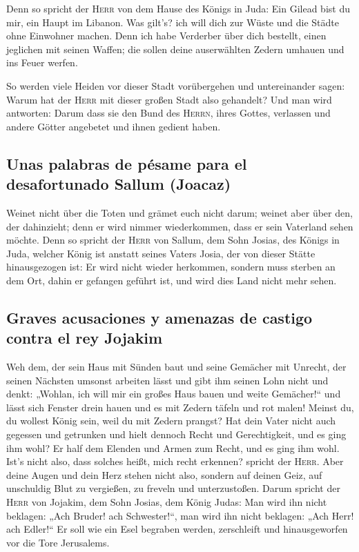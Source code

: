  Denn so spricht der \textsc{Herr} von dem Hause des
Königs in Juda: Ein Gilead bist du mir, ein Haupt im Libanon. Was
gilt's? ich will dich zur Wüste und die Städte ohne Einwohner machen.
 Denn ich habe Verderber über dich bestellt, einen
jeglichen mit seinen Waffen; die sollen deine auserwählten Zedern
umhauen und ins Feuer werfen.

 So werden viele Heiden vor dieser Stadt vorübergehen und
untereinander sagen: Warum hat der \textsc{Herr} mit dieser großen Stadt
also gehandelt?  Und man wird antworten: Darum dass sie
den Bund des \textsc{Herrn}, ihres Gottes, verlassen und andere Götter
angebetet und ihnen gedient haben.

\hypertarget{unas-palabras-de-puxe9same-para-el-desafortunado-sallum-joacaz}{%
\subsection{Unas palabras de pésame para el desafortunado Sallum
(Joacaz)}\label{unas-palabras-de-puxe9same-para-el-desafortunado-sallum-joacaz}}

 Weinet nicht über die Toten und grämet euch nicht darum;
weinet aber über den, der dahinzieht; denn er wird nimmer wiederkommen,
dass er sein Vaterland sehen möchte.  Denn so spricht der
\textsc{Herr} von Sallum, dem Sohn Josias, des Königs in Juda, welcher
König ist anstatt seines Vaters Josia, der von dieser Stätte
hinausgezogen ist: Er wird nicht wieder herkommen, 
sondern muss sterben an dem Ort, dahin er gefangen geführt ist, und wird
dies Land nicht mehr sehen.

\hypertarget{graves-acusaciones-y-amenazas-de-castigo-contra-el-rey-jojakim}{%
\subsection{Graves acusaciones y amenazas de castigo contra el rey
Jojakim}\label{graves-acusaciones-y-amenazas-de-castigo-contra-el-rey-jojakim}}

 Weh dem, der sein Haus mit Sünden baut und seine
Gemächer mit Unrecht, der seinen Nächsten umsonst arbeiten lässt und
gibt ihm seinen Lohn nicht  und denkt: „Wohlan, ich will
mir ein großes Haus bauen und weite Gemächer!{}`` und lässt sich Fenster
drein hauen und es mit Zedern täfeln und rot malen! 
Meinst du, du wollest König sein, weil du mit Zedern prangst? Hat dein
Vater nicht auch gegessen und getrunken und hielt dennoch Recht und
Gerechtigkeit, und es ging ihm wohl?  Er half dem Elenden
und Armen zum Recht, und es ging ihm wohl. Ist's nicht also, dass
solches heißt, mich recht erkennen? spricht der \textsc{Herr}.
 Aber deine Augen und dein Herz stehen nicht also,
sondern auf deinen Geiz, auf unschuldig Blut zu vergießen, zu freveln
und unterzustoßen.  Darum spricht der \textsc{Herr} von
Jojakim, dem Sohn Josias, dem König Judas: Man wird ihn nicht beklagen:
„Ach Bruder! ach Schwester!{}``, man wird ihn nicht beklagen: „Ach Herr!
ach Edler!{}``  Er soll wie ein Esel begraben werden,
zerschleift und hinausgeworfen vor die Tore Jerusalems.

